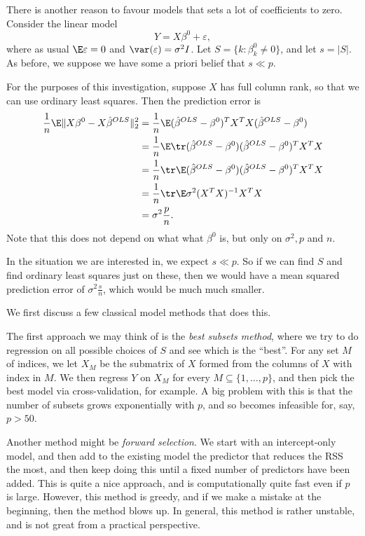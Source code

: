 \documentclass[a4paper]{article}
\begin{document}
There is another reason to favour models that sets a lot of coefficients to zero. Consider the linear model
\[
  Y = X \beta^0 + \varepsilon,
\]
where as usual $\E \varepsilon = 0$ and $\var(\varepsilon) = \sigma^2 I$. Let $S = \{k : \beta^0_k \not= 0\}$, and let $s = |S|$. As before, we suppose we have some a priori belief that $s \ll p$.

For the purposes of this investigation, suppose $X$ has full column rank, so that we can use ordinary least squares. Then the prediction error is
\begin{align*}
  \frac{1}{n} \E \|X \beta^0 - X \hat{\beta}^{OLS} \|_2^2 &= \frac{1}{n} \E (\hat{\beta}^{OLS} - \beta^0)^T X^T X (\hat{\beta}^{OLS} - \beta^0)\\
  &= \frac{1}{n} \E \tr (\hat{\beta}^{OLS} - \beta^0) (\hat{\beta}^{OLS} - \beta^0)^T X^T X\\
  &= \frac{1}{n} \tr \E(\hat{\beta}^{OLS} - \beta^0) (\hat{\beta}^{OLS} - \beta^0)^T X^T X\\
  &= \frac{1}{n} \tr \E \sigma^2 (X^T X)^{-1} X^T X\\
  &= \sigma^2 \frac{p}{n}.
\end{align*}
Note that this does not depend on what what $\beta^0$ is, but only on $\sigma^2, p$ and $n$.

In the situation we are interested in, we expect $s \ll p$. So if we can find $S$ and find ordinary least squares just on these, then we would have a mean squared prediction error of $\sigma^2 \frac{s}{n}$, which would be much much smaller.

We first discuss a few classical model methods that does this.

The first approach we may think of is the \emph{best subsets method}, where we try to do regression on all possible choices of $S$ and see which is the ``best''. For any set $M$ of indices, we let $X_M$ be the submatrix of $X$ formed from the columns of $X$ with index in $M$. We then regress $Y$ on $X_M$ for every $M \subseteq \{1, \ldots, p\}$, and then pick the best model via cross-validation, for example. A big problem with this is that the number of subsets grows exponentially with $p$, and so becomes infeasible for, say, $p > 50$.

Another method might be \emph{forward selection}. We start with an intercept-only model, and then add to the existing model the predictor that reduces the RSS the most, and then keep doing this until a fixed number of predictors have been added. This is quite a nice approach, and is computationally quite fast even if $p$ is large. However, this method is greedy, and if we make a mistake at the beginning, then the method blows up. In general, this method is rather unstable, and is not great from a practical perspective.
\end{document}
